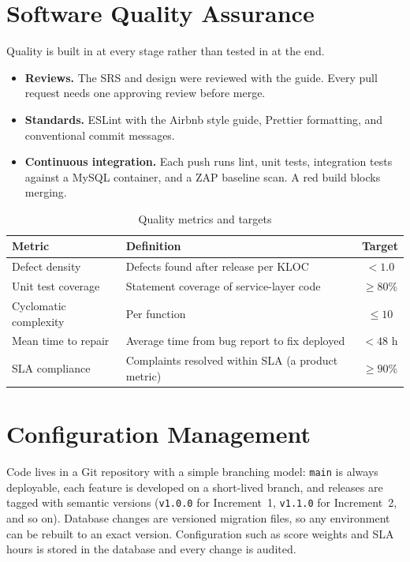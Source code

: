 \documentclass[11pt,a4paper]{report}
\begin{document}
\section{Software Quality Assurance}
Quality is built in at every stage rather than tested in at the end.
\begin{itemize}
  \item \textbf{Reviews.} The SRS and design were reviewed with the guide. Every pull request needs one approving review before merge.
  \item \textbf{Standards.} ESLint with the Airbnb style guide, Prettier formatting, and conventional commit messages.
  \item \textbf{Continuous integration.} Each push runs lint, unit tests, integration tests against a MySQL container, and a ZAP baseline scan. A red build blocks merging.
\end{itemize}

\begin{table}[H]
\centering\small
\caption{Quality metrics and targets}\label{tab:metrics}
\begin{tabularx}{\textwidth}{lLc}
\toprule
\textbf{Metric} & \textbf{Definition} & \textbf{Target}\\
\midrule
Defect density & Defects found after release per KLOC & $< 1.0$\\
Unit test coverage & Statement coverage of service-layer code & $\ge 80\%$\\
Cyclomatic complexity & Per function & $\le 10$\\
Mean time to repair & Average time from bug report to fix deployed & $< 48$ h\\
SLA compliance & Complaints resolved within SLA (a product metric) & $\ge 90\%$\\
\bottomrule
\end{tabularx}
\end{table}

\section{Configuration Management}
Code lives in a Git repository with a simple branching model: \texttt{main} is always deployable, each feature is developed on a short-lived branch, and releases are tagged with semantic versions (\texttt{v1.0.0} for Increment~1, \texttt{v1.1.0} for Increment~2, and so on). Database changes are versioned migration files, so any environment can be rebuilt to an exact version. Configuration such as score weights and SLA hours is stored in the database and every change is audited.
\end{document}
